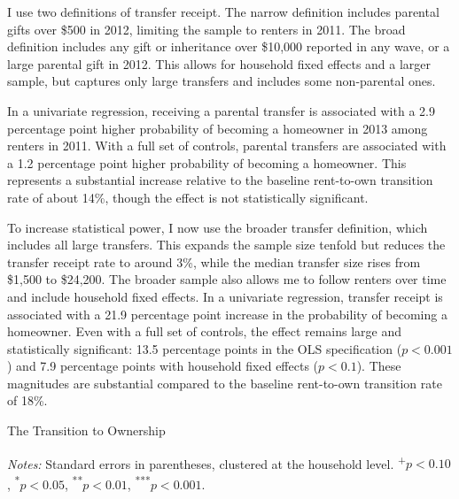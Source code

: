 \documentclass[12pt]{article}
\begin{document}
I use two definitions of transfer receipt. The narrow definition includes parental gifts over \$500 in 2012, limiting the sample to renters in 2011. The broad definition includes any gift or inheritance over \$10,000 reported in any wave, or a large parental gift in 2012. This allows for household fixed effects and a larger sample, but captures only large transfers and includes some non-parental ones.

In a univariate regression, receiving a parental transfer is associated with a 2.9 percentage point higher probability of becoming a homeowner in 2013 among renters in 2011. With a full set of controls, parental transfers are associated with a 1.2 percentage point higher probability of becoming a homeowner. This represents a substantial increase relative to the baseline rent-to-own transition rate of about 14\%, though the effect is not statistically significant. 

To increase statistical power, I now use the broader transfer definition, which includes all large transfers. This expands the sample size tenfold but reduces the transfer receipt rate to around 3\%, while the median transfer size rises from \$1,500 to \$24,200. The broader sample also allows me to follow renters over time and include household fixed effects. In a univariate regression, transfer receipt is associated with a 21.9 percentage point increase in the probability of becoming a homeowner. Even with a full set of controls, the effect remains large and statistically significant: 13.5 percentage points in the OLS specification ($p<0.001$) and 7.9 percentage points with household fixed effects ($p<0.1$). These magnitudes are substantial compared to the baseline rent-to-own transition rate of 18\%.

\begin{table}
	\center
	\begin{threeparttable}
		\caption{The Transition to Ownership}
		\label{tab:newowners}
		\small 
		

		{\begin{footnotesize}\begin{flushleft}
		\textit{Notes:} Standard errors in parentheses, clustered at the household level. \textsuperscript{+}$p<0.10$, \textsuperscript{*}$p<0.05$, \textsuperscript{**}$p<0.01$, \textsuperscript{***}$p<0.001$.
		\end{flushleft}\end{footnotesize}}		
	\end{threeparttable}
\end{table}
\end{document}
